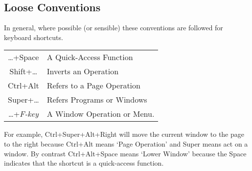 \documentclass[a4paper,11pt]{article}
\begin{document}
		\subsection{Loose Conventions}
			In general, where possible (or sensible) these conventions are followed
			for keyboard shortcuts.
			\begin{longtable}{ c l }
				\toprule
					\dots+Space & A Quick-Access Function \\
					Shift+\dots & Inverts an Operation \\
					Ctrl+Alt & Refers to a Page Operation \\
					Super+\dots & Refers Programs or Windows \\
					\dots+\emph{F-key} & A Window Operation or Menu. \\
				\bottomrule
			\end{longtable}
			
			For example, Ctrl+Super+Alt+Right will move the current window to the page
			to the right because Ctrl+Alt means `Page Operation' and Super means act
			on a window. By contrast Ctrl+Alt+Space means `Lower Window' because the
			Space indicates that the shortcut is a quick-access function.
	
	\clearpage
\end{document}
